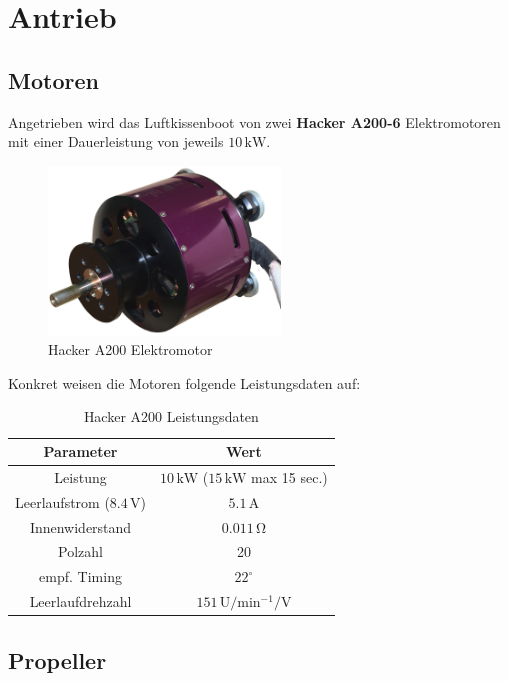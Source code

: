 \section{Antrieb}
\subsection{Motoren}
Angetrieben wird das Luftkissenboot von zwei \textbf{Hacker A200-6} Elektromotoren mit einer Dauerleistung von jeweils $10\,\mathrm{kW}$.\\
\begin{figure}[h]
    \centering
    \includegraphics[width=0.55\textwidth]{Fotos/Motor.png}
    \caption{Hacker A200 Elektromotor}
\end{figure}

Konkret weisen die Motoren folgende Leistungsdaten auf:\\
\begin{table}[h]
    \centering
    \begin{tabular}{|c|c|}
        \hline
        Parameter & Wert\\\hline
        Leistung & $10\,\mathrm{kW}$ ($15\,\mathrm{kW}$ max 15 sec.)\\
        Leerlaufstrom ($8.4\,\mathrm{V}$) & $5.1\,\mathrm{A}$\\
        Innenwiderstand & $0.011\,\mathrm{\Omega}$\\
        Polzahl & 20 \\
        empf. Timing & $22^\circ$\\
        Leerlaufdrehzahl&$151\,\mathrm{U/min^{-1}/V}$\\\hline

    \end{tabular}
    \caption{Hacker A200 Leistungsdaten}
\end{table}

\newpage
\subsection{Propeller}
